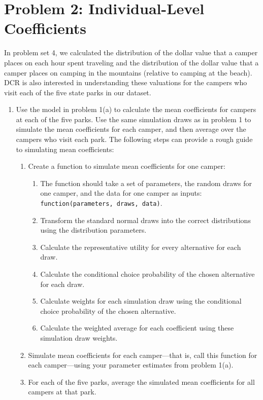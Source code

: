 \documentclass[11pt,letterpaper]{article}\usepackage[]{graphicx}\usepackage[]{xcolor}
\begin{document}
\section*{Problem 2: Individual-Level Coefficients}

In problem set 4, we calculated the distribution of the dollar value that a camper places on each hour spent traveling and the distribution of the dollar value that a camper places on camping in the mountains (relative to camping at the beach). DCR is also interested in understanding these valuations for the campers who visit each of the five state parks in our dataset. 

\begin{enumerate}[label=\alph*., leftmargin=*]
	\item Use the model in problem 1(a) to calculate the mean coefficients for campers at each of the five parks. Use the same simulation draws as in problem 1 to simulate the mean coefficients for each camper, and then average over the campers who visit each park. The following steps can provide a rough guide to simulating mean coefficients:
	\begin{enumerate}[label=\Roman*.]
		\item Create a function to simulate mean coefficients for one camper:
		\begin{enumerate}[label=\roman*.]
			\item The function should take a set of parameters, the random draws for one camper, and the data for one camper as inputs: \texttt{function(parameters, draws, data)}.
			\item Transform the standard normal draws into the correct distributions using the distribution parameters.
			\item Calculate the representative utility for every alternative for each draw.
			\item Calculate the conditional choice probability of the chosen alternative for each draw.
			\item Calculate weights for each simulation draw using the conditional choice probability of the chosen alternative.
			\item Calculate the weighted average for each coefficient using these simulation draw weights.
		\end{enumerate}
		\item Simulate mean coefficients for each camper---that is, call this function for each camper---using your parameter estimates from problem 1(a).
		\item For each of the five parks, average the simulated mean coefficients for all campers at that park.
	\end{enumerate}


\end{enumerate}
\end{document}
